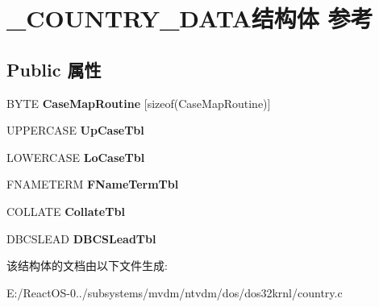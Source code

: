 \hypertarget{struct___c_o_u_n_t_r_y___d_a_t_a}{}\section{\+\_\+\+C\+O\+U\+N\+T\+R\+Y\+\_\+\+D\+A\+T\+A结构体 参考}
\label{struct___c_o_u_n_t_r_y___d_a_t_a}
\subsection*{Public 属性}
\begin{DoxyCompactItemize}
\item 
\mbox{\label{struct___c_o_u_n_t_r_y___d_a_t_a_a3cb1b357d5c4ecb7e3ad25d1b5591f8f}} 
B\+Y\+TE {\bfseries Case\+Map\+Routine} \mbox{[}sizeof(Case\+Map\+Routine)\mbox{]}
\item 
\mbox{\label{struct___c_o_u_n_t_r_y___d_a_t_a_ab0bb866ac44134805ab74cc6a8b6894f}} 
U\+P\+P\+E\+R\+C\+A\+SE {\bfseries Up\+Case\+Tbl}
\item 
\mbox{\label{struct___c_o_u_n_t_r_y___d_a_t_a_a053360a808a058b6bbe9bc3aaa6b2eb0}} 
L\+O\+W\+E\+R\+C\+A\+SE {\bfseries Lo\+Case\+Tbl}
\item 
\mbox{\label{struct___c_o_u_n_t_r_y___d_a_t_a_ac91630a2e4a3d8ed4cba6de7bd04a228}} 
F\+N\+A\+M\+E\+T\+E\+RM {\bfseries F\+Name\+Term\+Tbl}
\item 
\mbox{\label{struct___c_o_u_n_t_r_y___d_a_t_a_a91b3c81d83d267f8a65a76c3dbf46cab}} 
C\+O\+L\+L\+A\+TE {\bfseries Collate\+Tbl}
\item 
\mbox{\label{struct___c_o_u_n_t_r_y___d_a_t_a_a55b44de1fc2cc06544cf7b9c3373e885}} 
D\+B\+C\+S\+L\+E\+AD {\bfseries D\+B\+C\+S\+Lead\+Tbl}
\end{DoxyCompactItemize}


该结构体的文档由以下文件生成\+:\begin{DoxyCompactItemize}
\item 
E\+:/\+React\+O\+S-\/0../subsystems/mvdm/ntvdm/dos/dos32krnl/country.\+c\end{DoxyCompactItemize}
